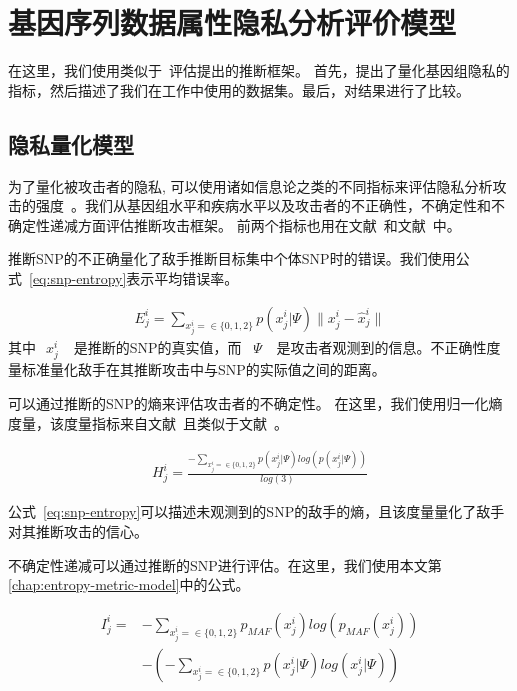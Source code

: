 \section{基因序列数据属性隐私分析评价模型} 


在这里，我们使用类似于~\cite{humbert2013addressing,deznabi2018inference}评估提出的推断框架。 首先，提出了量化基因组隐私的指标，然后描述了我们在工作中使用的数据集。最后，对结果进行了比较。

\subsection{隐私量化模型}

为了量化被攻击者的隐私, 可以使用诸如信息论之类的不同指标来评估隐私分析攻击的强度~\cite{marchini2007newa,shokri2011quantifying,serjantov2002towards}。我们从基因组水平和疾病水平以及攻击者的不正确性，不确定性和不确定性递减方面评估推断攻击框架。 前两个指标也用在文献~\cite{humbert2013addressing}和文献~\cite{deznabi2018inference}中。

推断SNP的不正确量化了敌手推断目标集中个体SNP时的错误。我们使用公式~\ref{eq:snp-entropy}表示平均错误率。

\begin{equation}
\begin{aligned}\label{eq:snp-error-rate}
E^i_j=\sum_{x^i_j=\in \{0,1,2\}}{p(x^i_j|\Psi)\|x^i_j - \hat{x}^i_j\|}
\end{aligned}
\end{equation}
其中~$~x^i_j~$~ 是推断的SNP的真实值，而 ~$\Psi~$~ 是攻击者观测到的信息。不正确性度量标准量化敌手在其推断攻击中与SNP的实际值之间的距离。

可以通过推断的SNP的熵来评估攻击者的不确定性。 在这里，我们使用归一化熵度量，该度量指标来自文献~\cite{humbert2013addressing}且类似于文献~\cite{deznabi2018inference}。

\begin{equation}
\begin{aligned}\label{eq:snp-entropy}
H^i_j=
\frac{-\sum_{x^i_j=\in \{0,1,2\}}{p(x^i_j|\Psi)log(p(x^i_j|\Psi))}}{log(3)}
\end{aligned}
\end{equation}

公式~\ref{eq:snp-entropy}可以描述未观测到的SNP的敌手的熵，且该度量量化了敌手对其推断攻击的信心。

不确定性递减可以通过推断的SNP进行评估。在这里，我们使用本文第\ref{chap:entropy-metric-model}中的公式。

\begin{equation}\label{eq:snp-mutual-information}
\begin{aligned}
I^i_j=& -\sum_{x^i_j=\in \{0,1,2\}}p_{MAF}(x^i_j)log(p_{MAF}(x^i_j))  \nonumber \\
& - (-\sum_{x^i_j=\in \{0,1,2\}}{p(x^i_j|\Psi)log(x^i_j|\Psi)})
\end{aligned}
\end{equation}


